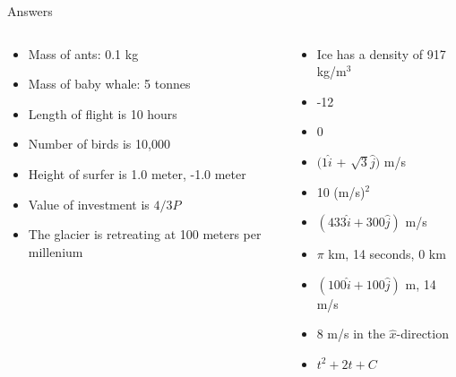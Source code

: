 \documentclass{beamer}
\begin{document}
\begin{frame}{Answers}
\begin{columns}[T]
\begin{column}{0.5\textwidth}
\begin{itemize}
\item Mass of ants: 0.1 kg
\item Mass of baby whale: 5 tonnes
\item Length of flight is 10 hours
\item Number of birds is 10,000
\item Height of surfer is 1.0 meter, -1.0 meter
\item Value of investment is $4/3 P$
\item The glacier is retreating at 100 meters per millenium
\end{itemize}
\end{column}
\begin{column}{0.5\textwidth}
\begin{itemize}
\item Ice has a density of 917 kg/m$^3$
\item -12
\item 0
\item $(1\hat{i}$ + $\sqrt{3}\hat{j})$  m/s
\item 10 (m/s)$^2$
\item $(433\hat{i}+300\hat{j})$ m/s
\item $\pi$ km, 14 seconds, $0$ km
\item $(100\hat{i} + 100\hat{j})$ m, 14 m/s
\item 8 m/s in the $\hat{x}$-direction
\item $t^2+2t + C$
\end{itemize}
\end{column}
\end{columns}
\end{frame}
\end{document}
